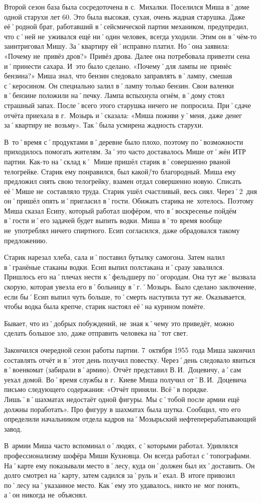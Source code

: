 Второй сезон база была сосредоточена в с.~Михалки. Поселился Миша в˚доме одной старухи лет 60. Это была высокая, сухая, очень жадная старушка. Даже её˚родной брат, работавший в˚сейсмической партии механиком, предупредил, что с˚ней не~уживался ещё ни˚один человек, всегда уходили. Этим он в˚чём-то заинтриговал Мишу. За˚квартиру ей˚исправно платил. Но˚она заявила: «Почему не~привёз  дров?» Привёз дрова. Далее она потребовала привезти сена и˚принести сахара. И~это было сделано. «Почему˚для лампы не~принёс бензина?» Миша знал, что бензин следовало заправлять в˚лампу, смешав с˚керосином. Он специально залил в˚лампу только бензин. Свои валенки в˚бензине положили на˚печку. Лампа вспыхнула огнём, в˚дому стоял страшный запах. После˚всего этого старушка ничего не~попросила. При˚сдаче отчёта приехала в г.~Мозырь и˚сказала: «Миша поживи у˚меня, даже денег за˚квартиру не~возьму». Так˚была усмирена жадность старухи.

В~то˚время с˚продуктами в˚деревне было плохо, поэтому по˚возможности приходилось помогать жителям. За˚это часто доставалось Мише от˚жён ИТР партии. Как-то на˚склад к˚ Мише пришёл старик в˚совершенно рваной телогрейке. Старик ему понравился, был какой\=/то благородный. Миша ему предложил снять свою телогрейку, взамен отдал совершенно новую. Списать её˚Мише не~составляло труда. Старик ушёл счастливый, весь сиял. Через˚2~дня он˚пришёл опять и˚пригласил в˚гости. Обижать старика не~хотелось. Поэтому Миша сказал Есипу, который работал шофёром, что в˚воскресенье пойдём в˚гости и˚его задачей будет выпить водки. Миша в˚то время вообще не~употреблял ничего спиртного. Есип согласился, даже обрадовался такому предложению. 

Старик нарезал хлеба, сала и˚поставил бутылку самогона. Затем налил в˚гранёные стаканы водки. Есип выпил полстакана и˚сразу завалился. Пришлось его на˚плечах нести к˚фельдшеру по˚огородам. Она тут же˚вызвала скорую, которая увезла его в˚больницу в˚г.˚Мозырь. Было сделано заключение, если бы˚Есип выпил чуть больше, то˚смерть наступила тут же. Оказывается, чтобы водка была крепче, старик настоял её˚на курином помёте.

Бывает, что из˚добрых побуждений, не~зная к˚чему это приведёт, можно сделать большое зло, даже отправить человека на˚тот свет. 

Закончился очередной сезон работы партии. 7~октября 1955~года Миша закончил составлять отчёт и в˚этот день получил повестку. Через˚день следовало явиться в˚военкомат (забирали в˚армию). Отчёт представил В.\,И.~Доцевичу, а˚сам уехал домой. Во˚время службы в г.~Киеве Миша получил от˚В.\,И.~Доцевича письмо следующего содержания: «Отчёт приняли. Всё˚в порядке. Лишь˚в˚шахматах недостаёт одной фигуры. Мы с˚тобой после армии ещё должны поработать». Про фигуру в шахматах была шутка. Сообщил, что его определили начальником отдела кадров на˚Мозырьский нефтеперерабатывающий завод.

В~армии Миша часто вспоминал о˚людях, с˚которыми работал. Удивлялся профессионализму шофёра Миши Кухновца. Он всегда работал с˚топографами. На˚карте ему показывали место в˚лесу, куда он˚должен был их˚доставить. Он долго смотрел на˚карту, затем садился за˚руль и˚ехал. В~итоге привозил по˚лесу на˚указанное место. Как˚ему это удавалось, никто не~мог понять, а˚он никогда не~объяснял.